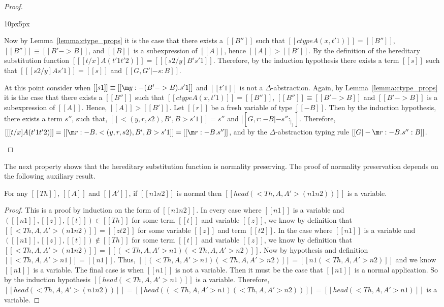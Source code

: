 \begin{proof}
\begin{changemargin}{10px}{5px}
\begin{itemize}
    Now by Lemma~\ref{lemma:ctype_props} it is the case that 
    there exists a $[[B'']]$ such that $[[ctype A (x,t'1)]] = [[B'']]$, 
    $[[B'']] \equiv [[B' -> B]]$, and $[[B]]$ is a subexpression of $[[A]]$, hence
    $[[A]] > [[B']]$.  By the definition of the hereditary substitution function
    $[[ [t/x] A (t'1 t'2)]] = [[ [s2/y] B' s'1]]$. Therefore, by the induction hypothesis there exists a 
    term $[[s]]$ such that $[[ [s2/y] A s'1]] = [[s]]$ and $[[G,G' |- s:B]]$.
    
    At this point consider when $[[s1]] \equiv [[\m y:{-(B'->B)}.s'1]]$ and $[[t'1]]$ is not a 
    $\Delta$-abstraction.  Again, by Lemma~\ref{lemma:ctype_props} it is the case that 
    there exists a $[[B'']]$ such that $[[ctype A (x,t'1)]] = [[B'']]$, $[[B'']] \equiv [[B' -> B]]$ and
    $[[B' -> B]]$ is a subexpression of $[[A]]$.  Hence, $[[A]] > [[B']]$. Let $[[r]]$ be a fresh variable of type $[[{-B}]]$.    
    Then by the induction hypothesis, there exists a term $s''$, such that, $[[<(y,r,s2),B',B>s'1]] = s''$ and 
    $[[G,r:{-B} |- s'' : _|_]]$.  Therefore, $[[ [t/x] A (t'1 t'2)]] = [[\m r:{-B}.<(y,r,s2),B',B>s'1]] = [[\m r:{-B}.s'']]$,
    and by the $\Delta$-abstraction typing rule $[[G |- \m r:{-B}.s'' : B]]$.
  \end{itemize}
  \end{changemargin}
\end{proof}
The next property shows that the hereditary substitution function is
normality preserving. The proof of normality preservation depends on
the following auxiliary result.
\begin{lemma}
  \label{lemma:ssub_var_head}
  For any $[[Th]]$, $[[A]]$ and $[[A']]$, if $[[n1 n2]]$ is normal then 
  $[[head (<Th,A,A'>(n1 n2))]]$ is a variable.
\end{lemma}
\begin{proof}
  This is a proof by induction on the form of $[[n1 n2]]$.
In every case where $[[n1]]$ is a variable and $([[n1]],[[z]],[[t]]) \in [[Th]]$ for some 
term $[[t]]$ and variable $[[z]]$, we know by definition
that $[[<Th,A,A'>(n1 n2)]] = [[z t2]]$ for some variable $[[z]]$ 
and term $[[t2]]$.  In the case where $[[n1]]$ is a variable and 
$([[n1]],[[z]],[[t]]) \not\in [[Th]]$ for some 
term $[[t]]$ and variable $[[z]]$, we know by definition
that $[[<Th,A,A'>(n1 n2)]] = [[(<Th,A,A'>n1) (<Th,A,A'>n2)]]$.  Now
by hypothesis and definition $[[<Th,A,A'>n1]] = [[n1]]$.  Thus,
$[[(<Th,A,A'>n1) (<Th,A,A'>n2)]] = [[n1 (<Th,A,A'>n2)]]$ and we know $[[n1]]$ is
a variable.  The final case is when $[[n1]]$ is not a variable.  Then it must
be the case that $[[n1]]$ is a normal application.  So by the induction hypothesis
$[[head (<Th,A,A'>n1)]]$ is a variable.  Therefore,
$[[head (<Th,A,A'>(n1 n2))]] = [[head ((<Th,A,A'> n1) (<Th,A,A'> n2))]] = [[head (<Th,A,A'> n1)]]$ is a variable.
\end{proof}
